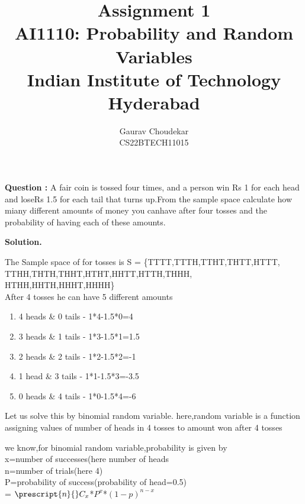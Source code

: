 \documentclass[journal,12pt,twocolumn]{IEEEtran}
\newcommand\Mycomb[2][^n]{\prescript{#1\mkern-0.5mu}{}C_{#2}}
\begin{document}
\let\vec\mathbf

\title{Assignment 1 \\ \Large AI1110: Probability and Random Variables \\ \Large Indian Institute of Technology Hyderabad}
\author{Gaurav Choudekar \\ \normalsize CS22BTECH11015}

        \maketitle	
	\textbf{Question :}
	A fair coin is tossed four times, and a person win  Rs 1 for each head and loseRs 1.5 for each tail that turns up.From the sample space calculate how miany different amounts of money you canhave after four tosses and the probability of having each of these amounts.
        
	\textbf{Solution.}

	The Sample space of for tosses is 
	S = \{TTTT,TTTH,TTHT,THTT,HTTT, TTHH,THTH,THHT,HTHT,HHTT,HTTH,THHH, HTHH,HHTH,HHHT,HHHH\}\\
	After 4 tosses he can have 5 different amounts
        \begin{enumerate}
	\item	4 heads \& 0 tails - 1*4-1.5*0=4
	\item	3 heads \& 1 tails - 1*3-1.5*1=1.5
	\item	2 heads \& 2 tails - 1*2-1.5*2=-1
	\item   1 head  \& 3 tails - 1*1-1.5*3=-3.5
	\item   0 heads \& 4 tails - 1*0-1.5*4=-6       
	\end{enumerate}

	Let us solve this by binomial random variable.
        here,random variable is a function assigning values of number of heads in 4 tosses to amount won after 4 tosses
       
        we know,for binomial random variable,probability is given by \\
        x=number of successes(here number of heads\\
        n=number of trials(here 4)\\
        P=probability of success(probability of head=0.5)\\
        = ${\Mycomb[n]{x}}$*${P^x}$*${{(1-p)}^{n-x}}$\\
        
\end{document}
